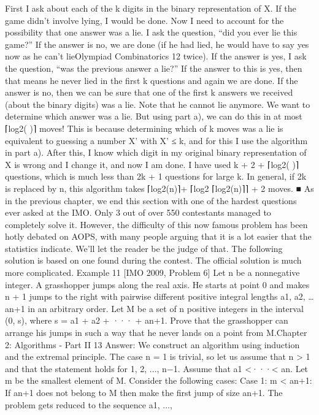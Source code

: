 \documentclass[a4paper,11pt]{book}
\begin{document}
First I ask about each of the k digits in the binary representation
of X. If the game didn’t involve lying, I would be done. Now I need
to account for the possibility that one answer was a lie. I ask the
question, “did you ever lie this game?” If the answer is no, we are
done (if he had lied, he would have to say yes now as he can’t lieOlympiad Combinatorics 12
twice). If the answer is yes, I ask the question, “was the previous
answer a lie?” If the answer to this is yes, then that means he
never lied in the first k questions and again we are done. If the
answer is no, then we can be sure that one of the first k answers
we received (about the binary digits) was a lie. Note that he
cannot lie anymore. We want to determine which answer was a
lie. But using part a), we can do this in at most ⌈log2( )⌉ moves!
This is because determining which of k moves was a lie is
equivalent to guessing a number X’ with X’ ≤ k, and for this I use
the algorithm in part a). After this, I know which digit in my
original binary representation of X is wrong and I change it, and
now I am done. I have used k + 2 + ⌈log2( )⌉ questions, which is
much less than 2k + 1 questions for large k.
In general, if 2k is replaced by n, this algorithm takes ⌈log2(n)⌉+
⌈log2 ⌈log2(n)⌉⌉ + 2 moves. ■
As in the previous chapter, we end this section with one of the
hardest questions ever asked at the IMO. Only 3 out of over 550
contestants managed to completely solve it. However, the
difficulty of this now famous problem has been hotly debated on
AOPS, with many people arguing that it is a lot easier that the
statistics indicate. We’ll let the reader be the judge of that. The
following solution is based on one found during the contest. The
official solution is much more complicated.
Example 11 [IMO 2009, Problem 6]
Let n be a nonnegative integer. A grasshopper jumps along the
real axis. He starts at point 0 and makes n + 1 jumps to the right
with pairwise different positive integral lengths a1, a2, … an+1 in an
arbitrary order. Let M be a set of n positive integers in the interval
(0, s), where s = a1 + a2 + ··· + an+1. Prove that the grasshopper can
arrange his jumps in such a way that he never lands on a point
from M.Chapter 2: Algorithms - Part II 13
Answer:
We construct an algorithm using induction and the extremal
principle. The case n = 1 is trivial, so let us assume that n > 1 and
that the statement holds for 1, 2, ..., n−1. Assume that a1 <···< an.
Let m be the smallest element of M. Consider the following cases:
Case 1: m < an+1: If an+1 does not belong to M then make the first
jump of size an+1. The problem gets reduced to the sequence a1, ...,
\end{document}
